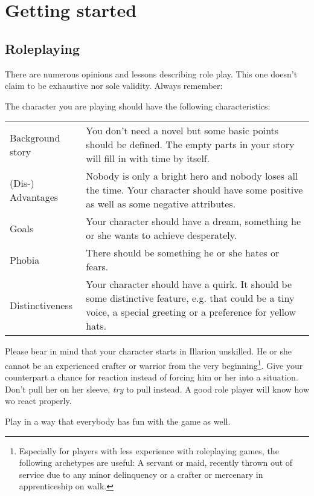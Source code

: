\documentclass[a4paper,11pt]{scrreprt}
\begin{document}
\chapter{Getting started}
\section{Roleplaying}

There are numerous opinions and lessons describing role play. This one doesn’t claim to be exhaustive nor sole validity. Always remember:
\begin{center}
\end{center}

The character you are playing should have the following characteristics: 
\begin{table}[h]
\begin{tabular}{ l p{12.5cm}}
Background story & You don’t need a novel but some basic points should be 
defined. The empty parts in your story will fill in with time by 
itself. \\
(Dis-) Advantages & Nobody is only a bright hero and nobody loses all the 
time. Your character should have some positive as well as some negative attributes. \\
Goals & Your character should have a dream, something he or she 
wants to achieve desperately. \\
Phobia & There should be something he or she hates or fears. \\
Distinctiveness & Your character should have a quirk. It should be some distinctive feature, e.g. that could be a tiny voice, a 
special greeting or a preference for yellow hats. 
\end{tabular}
\end{table}

Please bear in mind that your character starts in Illarion unskilled. He or she cannot be an experienced crafter or warrior from the very beginning\footnote{Especially for players with less experience with roleplaying games, the following archetypes are useful: A servant or maid, recently thrown out of service due to any minor delinquency or a crafter or mercenary in apprenticeship on walk.}.
Give your counterpart a chance for reaction instead of forcing him or her into a situation. Don’t pull her on her sleeve, \emph{try} to pull instead. A good role player will know how wo react properly.

Play in a way that everybody has fun with the game as well.
\end{document}
